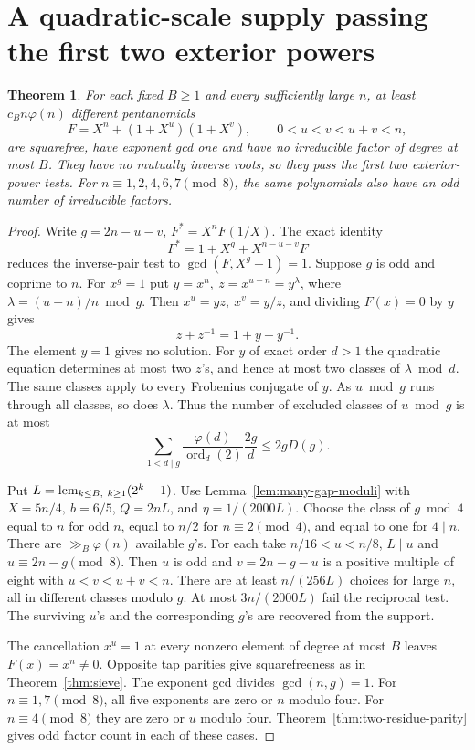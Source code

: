 \documentclass[11pt]{article}
\newtheorem{theorem}{Theorem}
\newcommand{\ord}{\operatorname{ord}}
\begin{document}
\section{A quadratic-scale supply passing the first two exterior powers}
\label{sec:totient-reciprocal}
\begin{theorem}\label{thm:totient-reciprocal}
For each fixed \(B\ge1\) and every sufficiently large \(n\), at
least \(c_B n\varphi(n)\) different pentanomials
\[
 F=X^n+(1+X^u)(1+X^v),\qquad 0<u<v<u+v<n ,
\]
are squarefree, have exponent gcd one and have no irreducible
factor of degree at most \(B\). They have no mutually inverse roots,
so they pass the first two exterior-power tests. For
\(n\equiv1,2,4,6,7\pmod8\), the same polynomials also have an odd number
of irreducible factors.
\end{theorem}
\begin{proof}
Write \(g=2n-u-v\), \(F^*=X^nF(1/X)\). The exact identity
\[
 F^*=1+X^g+X^{n-u-v}F
\]
reduces the inverse-pair test to \(\gcd(F,X^g+1)=1\).
Suppose \(g\) is odd and coprime to \(n\).
For \(x^g=1\) put \(y=x^n,\ z=x^{u-n}=y^\lambda\), where
\(\lambda=(u-n)/n\bmod g\). Then \(x^u=yz,\ x^v=y/z\), and
dividing \(F(x)=0\) by \(y\) gives
\[
 z+z^{-1}=1+y+y^{-1}.
\]
The element \(y=1\) gives no solution. For \(y\) of exact order
\(d>1\) the quadratic equation determines at most two \(z\)'s,
and hence at most two classes of \(\lambda\bmod d\). The same
classes apply to every Frobenius conjugate of \(y\).
As \(u\bmod g\) runs through all classes, so does \(\lambda\).
Thus the number of excluded classes of \(u\bmod g\) is at most
\[
 \sum_{1<d\mid g}\frac{\varphi(d)}{\ord_d(2)}\frac{2g}{d}
 \le 2gD(g).
\]

Put \(L=\mathop{\rm lcm}_{k\le B,\ k\ge1}(2^k-1)\).
Use Lemma~\ref{lem:many-gap-moduli} with \(X=5n/4,\ b=6/5\),
\(Q=2nL\), and \(\eta=1/(2000L)\). Choose the class of
\(g\bmod4\) equal to \(n\) for odd \(n\), equal to \(n/2\)
for \(n\equiv2\pmod4\), and equal to one for \(4\mid n\).
There are \(\gg_B\varphi(n)\) available
\(g\)'s. For each take \(n/16<u<n/8\), \(L\mid u\) and
\(u\equiv 2n-g\pmod8\). Then \(u\) is odd and
\(v=2n-g-u\) is a positive multiple of eight with \(u<v<u+v<n\).
There are at least \(n/(256L)\) choices for large \(n\), all
in different classes modulo \(g\). At most \(3n/(2000L)\) fail
the reciprocal test. The surviving \(u\)'s and the corresponding
\(g\)'s are recovered from the support.

The cancellation \(x^u=1\) at every nonzero element of degree
at most \(B\) leaves \(F(x)=x^n\ne0\). Opposite tap parities
give squarefreeness as in Theorem~\ref{thm:sieve}. The exponent gcd divides
\(\gcd(n,g)=1\). For \(n\equiv1,7\pmod8\), all five exponents are
zero or \(n\) modulo four. For \(n\equiv4\pmod8\) they are zero
or \(u\) modulo four. Theorem~\ref{thm:two-residue-parity} gives
odd factor count in each of these cases.


\end{proof}
\end{document}
